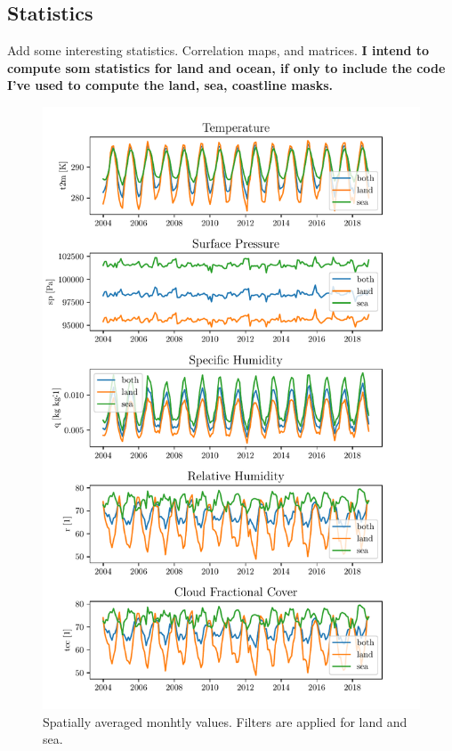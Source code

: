 \subsection{Statistics}
Add some interesting statistics. Correlation maps, and matrices.
\textbf{I intend to compute som statistics for land and ocean, if only to include the code I've used to compute the land, sea, coastline masks.}

\begin{figure}
    \centering
    \includegraphics{python_figs/monthly_means.pdf}
    \caption{Spatially averaged monhtly values. Filters are applied for land and sea.}
    \label{fig:monthly_mean_ts_vars}
\end{figure}



